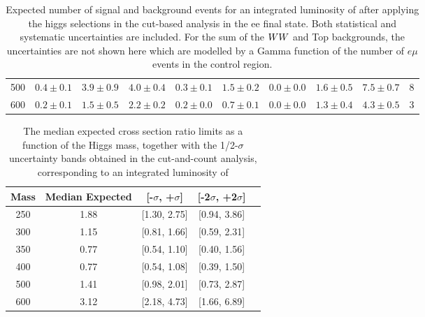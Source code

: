 \begin{table}[!ht]
{\begin{center}
\begin{tabular}{l | c c |  c c c c c c | c }
500 & $0.4\pm0.1$ & $3.9\pm0.9$ & $4.0\pm0.4$ & $0.3\pm0.1$ & $1.5\pm0.2$ & $0.0\pm0.0$ & $1.6\pm0.5$ & $7.5\pm0.7$ & 8 \\
600 & $0.2\pm0.1$ & $1.5\pm0.5$ & $2.2\pm0.2$ & $0.2\pm0.0$ & $0.7\pm0.1$ & $0.0\pm0.0$ & $1.3\pm0.4$ & $4.3\pm0.5$ & 3 \\
\hline\hline
\end{tabular}
\end{center}
}
\caption{Expected number of signal and background events for an integrated luminosity of \intlumi after applying the higgs selections 
  in the cut-based analysis in the ee final state. Both statistical and systematic uncertainties are included. For the sum of the $WW$ and Top backgrounds, the uncertainties are 
  not shown here which are modelled by a Gamma function of the number of $e\mu$ events in the control region.  }
\label{tab:yield_cutbased}
\end{table}

\begin{table}[!ht]
\begin{center}
\begin{tabular}{ccccc}
\hline\hline
Mass & Median Expected & [-$\sigma$, +$\sigma$] & [-2$\sigma$, +2$\sigma$]\\\hline
250 & 1.88 & [1.30, 2.75] & [0.94, 3.86] \\
300 & 1.15 & [0.81, 1.66] & [0.59, 2.31] \\
350 & 0.77 & [0.54, 1.10] & [0.40, 1.56] \\
400 & 0.77 & [0.54, 1.08] & [0.39, 1.50] \\
500 & 1.41 & [0.98, 2.01] & [0.73, 2.87] \\
600 & 3.12 & [2.18, 4.73] & [1.66, 6.89] \\
\hline\hline
\end{tabular}
\end{center}
\caption{The median expected cross section ratio limits as a function 
of the Higgs mass, together with the 1/2-$\sigma$ uncertainty bands obtained in the cut-and-count analysis, corresponding to 
an integrated luminosity of \intlumi}
\label{tab:limits_cutbased_4fb}
\end{table}


\clearpage
